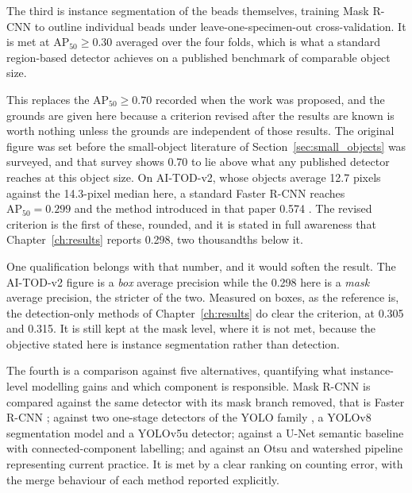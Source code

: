 The third is instance segmentation of the beads themselves, training Mask R-CNN
to outline individual beads under leave-one-specimen-out cross-validation. It is
met at $\mathrm{AP}_{50} \geq 0.30$ averaged over the four folds, which is what a
standard region-based detector achieves on a published benchmark of comparable
object size.

This replaces the $\mathrm{AP}_{50} \geq 0.70$ recorded when the work was
    proposed, and the grounds are given here because a criterion revised after the
    results are known is worth nothing unless the grounds are independent of those
    results. The original figure was set before the small-object literature of
    Section~\ref{sec:small_objects} was surveyed, and that survey shows 0.70 to lie
    above what any published detector reaches at this object size. On AI-TOD-v2,
    whose objects average 12.7 pixels against the 14.3-pixel median here, a
    standard Faster R-CNN reaches $\mathrm{AP}_{50} = 0.299$ and the method
    introduced in that paper 0.574 \cite{xu2022tiny}. The revised criterion is the
    first of these, rounded, and it is stated in full awareness that
    Chapter~\ref{ch:results} reports 0.298, two thousandths below it.

    One qualification belongs with that number, and it would soften the result.
    The AI-TOD-v2 figure is a \emph{box} average precision while the 0.298 here is
    a \emph{mask} average precision, the stricter of the two. Measured on boxes,
    as the reference is, the detection-only methods of Chapter~\ref{ch:results} do
    clear the criterion, at 0.305 and 0.315. It is still kept at the mask
    level, where it is not met, because the objective stated here is instance
    segmentation rather than detection.

The fourth is a comparison against five alternatives, quantifying what
instance-level modelling gains and which component is responsible. Mask R-CNN is
compared against the same detector with its mask branch removed, that is Faster
R-CNN \cite{ren2015faster}; against two one-stage detectors of the YOLO family
\cite{jocher2023ultralytics}, a YOLOv8 segmentation model and a YOLOv5u detector;
against a U-Net \cite{ronneberger2015unet} semantic baseline with
connected-component labelling; and against an Otsu \cite{otsu1979threshold} and
watershed \cite{vincent1991watersheds} pipeline representing current practice. It
is met by a clear ranking on counting error, with the merge behaviour of each
method reported explicitly.

